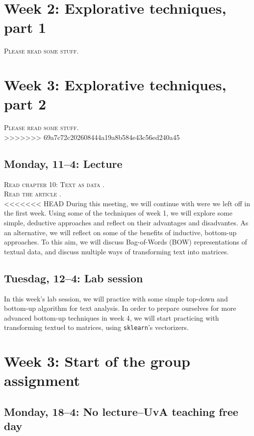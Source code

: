 \section*{Week 2: Explorative techniques, part 1}
\textsc{Please read some stuff.}\\

\section*{Week 3: Explorative techniques, part 2}
\textsc{Please read some stuff.}\\
>>>>>>> 69a7c72c202608444a19a8b584e43c56ed240a45

\subsection*{Monday, 11--4: Lecture}
\textsc{Read chapter 10: Text as data \cite{van2021computational}.} \\
\textsc{Read the article \cite{Boumans2016}.} \\

<<<<<<< HEAD
During this meeting, we will continue with were we left off in the first week. Using some of the techniques of week 1, we will explore some simple, deductive approaches and reflect on their advantages and disadvantes. As an alternative, we will reflect on some of the benefits of inductive, bottom-up approaches. To this aim, we will discuss Bag-of-Words (BOW) representations of textual data, and discuss multiple ways of transforming text into matrices. 

\subsection*{Tuesdag, 12--4: Lab session}
In this week's lab session, we will practice with some simple top-down and bottom-up algorithm for text analysis. In order to prepare ourselves for more advanced bottom-up techniques in week 4, we will start practicing with transforming textuel to matrices, using  \texttt{sklearn}'s vectorizers. 

\section*{Week 3: Start of the group assignment}

\subsection*{Monday, 18--4: No lecture--UvA teaching free day}

